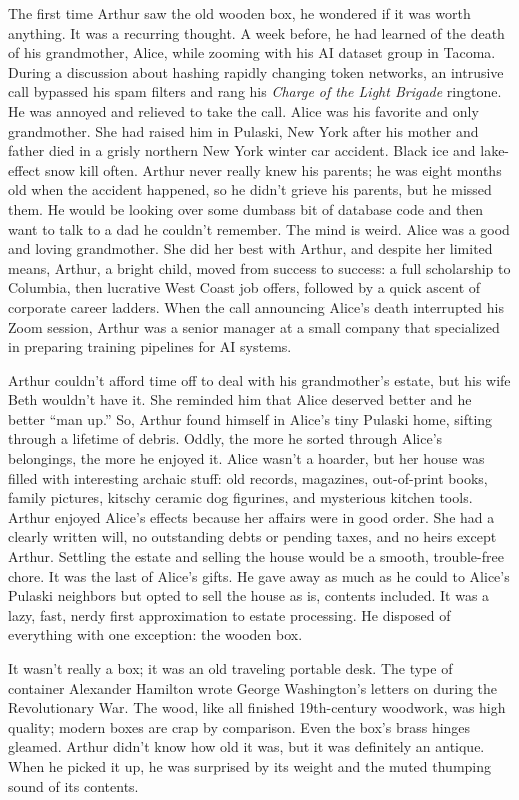 The first time Arthur saw the old wooden box, he wondered if it was
worth anything. It was a recurring thought. A week before, he had
learned of the death of his grandmother, Alice, while zooming with his
AI dataset group in Tacoma. During a discussion about hashing rapidly
changing token networks, an intrusive call bypassed his spam filters and
rang his \emph{Charge of the Light Brigade} ringtone. He was annoyed and
relieved to take the call. Alice was his favorite and only grandmother.
She had raised him in Pulaski, New York after his mother and father died
in a grisly northern New York winter car accident. Black ice and
lake-effect snow kill often. Arthur never really knew his parents; he
was eight months old when the accident happened, so he didn't grieve his
parents, but he missed them. He would be looking over some dumbass bit
of database code and then want to talk to a dad he couldn't remember.
The mind is weird. Alice was a good and loving grandmother. She did her
best with Arthur, and despite her limited means, Arthur, a bright child,
moved from success to success: a full scholarship to Columbia, then
lucrative West Coast job offers, followed by a quick ascent of corporate
career ladders. When the call announcing Alice's death interrupted his
Zoom session, Arthur was a senior manager at a small company that
specialized in preparing training pipelines for AI systems.

Arthur couldn't afford time off to deal with his grandmother's estate,
but his wife Beth wouldn't have it. She reminded him that Alice deserved
better and he better ``man up.'' So, Arthur found himself in Alice's
tiny Pulaski home, sifting through a lifetime of debris. Oddly, the more
he sorted through Alice's belongings, the more he enjoyed it. Alice
wasn't a hoarder, but her house was filled with interesting archaic
stuff: old records, magazines, out-of-print books, family pictures,
kitschy ceramic dog figurines, and mysterious kitchen tools. Arthur
enjoyed Alice's effects because her affairs were in good order. She had
a clearly written will, no outstanding debts or pending taxes, and no
heirs except Arthur. Settling the estate and selling the house would be
a smooth, trouble-free chore. It was the last of Alice's gifts. He gave
away as much as he could to Alice's Pulaski neighbors but opted to sell
the house as is, contents included. It was a lazy, fast, nerdy first
approximation to estate processing. He disposed of everything with one
exception: the wooden box.

It wasn't really a box; it was an old traveling portable desk. The type
of container Alexander Hamilton wrote George Washington's letters on
during the Revolutionary War. The wood, like all finished 19th-century
woodwork, was high quality; modern boxes are crap by comparison. Even
the box's brass hinges gleamed. Arthur didn't know how old it was, but
it was definitely an antique. When he picked it up, he was surprised by
its weight and the muted thumping sound of its contents.

